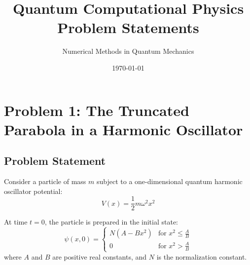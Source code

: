 \documentclass[11pt,a4paper]{article}
\title{Quantum Computational Physics \\ \large Problem Statements}
\author{Numerical Methods in Quantum Mechanics}
\date{\today}
\begin{document}
\maketitle

\tableofcontents
\newpage

\section{Problem 1: The Truncated Parabola in a Harmonic Oscillator}
\label{sec:problem1}

\subsection*{Problem Statement}
Consider a particle of mass $m$ subject to a one-dimensional quantum harmonic oscillator potential:
\begin{equation}
    V(x) = \frac{1}{2}m\omega^2x^2
\end{equation}

At time $t=0$, the particle is prepared in the initial state:
\begin{equation}
    \psi(x,0) = 
    \begin{cases} 
        N(A - Bx^2) & \text{for } x^2 \le \frac{A}{B} \\ 
        0 & \text{for } x^2 > \frac{A}{B} 
    \end{cases}
\end{equation}
where $A$ and $B$ are positive real constants, and $N$ is the normalization constant.
\end{document}
